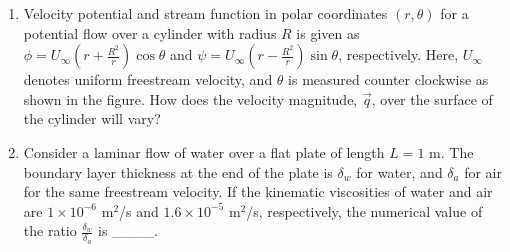 \documentclass[journal,12pt,onecolumn]{IEEEtran}
\theoremstyle{remark}
\begin{document}
\begin{enumerate}
\item Velocity potential and stream function in polar coordinates $(r, \theta)$ for a potential flow over a cylinder with radius $R$ is given as $\phi = U_\infty \left(r + \frac{R^2}{r}\right)\cos\theta$ and $\psi = U_\infty \left(r - \frac{R^2}{r}\right)\sin\theta$, respectively. Here, $U_\infty$ denotes uniform freestream velocity, and $\theta$ is measured counter clockwise as shown in the figure. How does the velocity magnitude, $\vec{q}$, over the surface of the cylinder will vary?

\begin{figure}[!ht]
	\centering
	
	\label{fig:my_label}
\end{figure}

\begin{enumerate}
\end{enumerate}

\item Consider a laminar flow of water over a flat plate of length $L = 1$ m. The boundary layer thickness at the end of the plate is $\delta_w$ for water, and $\delta_a$ for air for the same freestream velocity. If the kinematic viscosities of water and air are $1 \times 10^{-6}$ m$^2$/s and $1.6 \times 10^{-5}$ m$^2$/s, respectively, the numerical value of the ratio $\frac{\delta_w}{\delta_a}$ is \_\_\_\_.\\



\end{enumerate}
\end{document}
